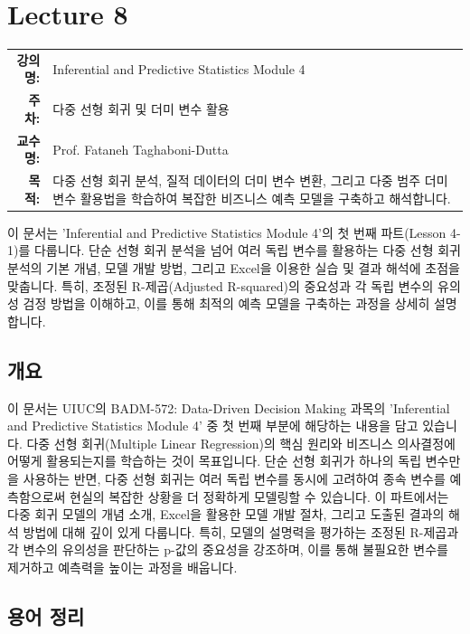 \documentclass[11pt,a4paper]{book}
\makeatletter
\theoremstyle{definition}
\newcommand{\metainfo}[4]{
\begin{tcolorbox}[
    colback=lightpurple,
    colframe=darkpurple,
    boxrule=1pt,
    arc=2mm,
    left=10pt,
    right=10pt,
    top=8pt,
    bottom=8pt
]
\begin{tabular}{@{}rl@{}}
\textbf{강의명:} & #1 \\[0.3em]
\textbf{주차:} & #2 \\[0.3em]
\textbf{교수명:} & #3 \\[0.3em]
\textbf{목적:} & \begin{minipage}[t]{0.75\textwidth}#4\end{minipage}
\end{tabular}
\end{tcolorbox}
}
\makeatother
\begin{document}
\chapter{Lecture 8}
\label{ch:module8}

\metainfo{Inferential and Predictive Statistics Module 4}{다중 선형 회귀 및 더미 변수 활용}{Prof. Fataneh Taghaboni-Dutta}{다중 선형 회귀 분석, 질적 데이터의 더미 변수 변환, 그리고 다중 범주 더미 변수 활용법을 학습하여 복잡한 비즈니스 예측 모델을 구축하고 해석합니다.}


\begin{summarybox}
이 문서는 'Inferential and Predictive Statistics Module 4'의 첫 번째 파트(Lesson 4-1)를 다룹니다.
단순 선형 회귀 분석을 넘어 여러 독립 변수를 활용하는 다중 선형 회귀 분석의 기본 개념, 모델 개발 방법, 그리고 Excel을 이용한 실습 및 결과 해석에 초점을 맞춥니다.
특히, 조정된 R-제곱(Adjusted R-squared)의 중요성과 각 독립 변수의 유의성 검정 방법을 이해하고, 이를 통해 최적의 예측 모델을 구축하는 과정을 상세히 설명합니다.
\end{summarybox}


\section{개요}
이 문서는 UIUC의 BADM-572: Data-Driven Decision Making 과목의 'Inferential and Predictive Statistics Module 4' 중 첫 번째 부분에 해당하는 내용을 담고 있습니다.
다중 선형 회귀(Multiple Linear Regression)의 핵심 원리와 비즈니스 의사결정에 어떻게 활용되는지를 학습하는 것이 목표입니다.
단순 선형 회귀가 하나의 독립 변수만을 사용하는 반면, 다중 선형 회귀는 여러 독립 변수를 동시에 고려하여 종속 변수를 예측함으로써 현실의 복잡한 상황을 더 정확하게 모델링할 수 있습니다.
이 파트에서는 다중 회귀 모델의 개념 소개, Excel을 활용한 모델 개발 절차, 그리고 도출된 결과의 해석 방법에 대해 깊이 있게 다룹니다.
특히, 모델의 설명력을 평가하는 조정된 R-제곱과 각 변수의 유의성을 판단하는 p-값의 중요성을 강조하며, 이를 통해 불필요한 변수를 제거하고 예측력을 높이는 과정을 배웁니다.


\section{용어 정리}
\end{document}
